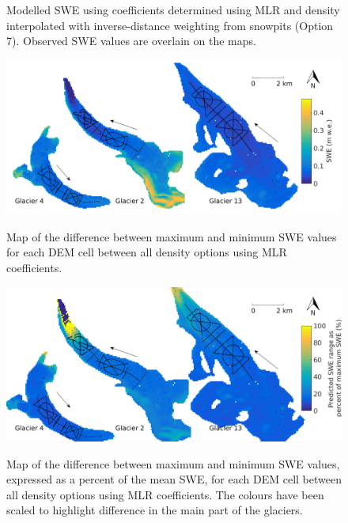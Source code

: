 \documentclass[12pt]{article}
\begin{document}
\begin{figure}[H]
	\caption{Modelled SWE using coefficients determined using MLR and density interpolated with inverse-distance weighting from snowpits (Option 7). Observed SWE values are overlain on the maps.}
	\label{fig:MLRmodelledSWE}
\end{figure}

\begin{figure}[H]
	\centering
	\includegraphics[width =\textwidth]{MLR_SWEdifferenceMap.png}\\
	\caption{Map of the difference between maximum and minimum SWE values for each DEM cell between all density options using MLR coefficients.}
	\label{fig:MLR_SWEdiffMap}
\end{figure}

 \begin{figure}[H]
	\centering
	\includegraphics[width =\textwidth]{MLR_SWEdifferenceMap_percent.png}\\
	\caption{Map of the difference between maximum and minimum SWE values, expressed as a percent of the mean SWE, for each DEM cell between all density options using MLR coefficients. The colours have been scaled to highlight difference in the main part of the glaciers.}
	\label{fig:MLR_SWEdiffMapPercent}
\end{figure}
 
\end{document}
